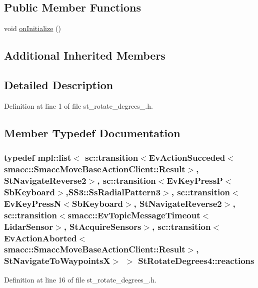 \subsection*{Public Member Functions}
\begin{DoxyCompactItemize}
\item 
void \hyperlink{structStRotateDegrees4_a25d516dde465ddfedc3a875fd93b9f47}{on\+Initialize} ()
\end{DoxyCompactItemize}
\subsection*{Additional Inherited Members}


\subsection{Detailed Description}


Definition at line 1 of file st\+\_\+rotate\+\_\+degrees\+\_.\+h.



\subsection{Member Typedef Documentation}
\subsubsection[{\texorpdfstring{reactions}{reactions}}]{\setlength{\rightskip}{0pt plus 5cm}typedef mpl\+::list$<$ sc\+::transition$<$Ev\+Action\+Succeded$<$smacc\+::\+Smacc\+Move\+Base\+Action\+Client\+::\+Result$>$, {\bf St\+Navigate\+Reverse2}$>$, sc\+::transition$<$Ev\+Key\+PressP$<$Sb\+Keyboard$>$,{\bf S\+S3\+::\+Ss\+Radial\+Pattern3}$>$, sc\+::transition$<$Ev\+Key\+PressN$<$Sb\+Keyboard$>$, {\bf St\+Navigate\+Reverse2}$>$, sc\+::transition$<${\bf smacc\+::\+Ev\+Topic\+Message\+Timeout}$<${\bf Lidar\+Sensor}$>$, {\bf St\+Acquire\+Sensors}$>$, sc\+::transition$<$Ev\+Action\+Aborted$<$smacc\+::\+Smacc\+Move\+Base\+Action\+Client\+::\+Result$>$, {\bf St\+Navigate\+To\+WaypointsX}$>$ $>$ {\bf St\+Rotate\+Degrees4\+::reactions}}\hypertarget{structStRotateDegrees4_afd68a8061d932ed3aa2e332700f3c430}{}\label{structStRotateDegrees4_afd68a8061d932ed3aa2e332700f3c430}


Definition at line 16 of file st\+\_\+rotate\+\_\+degrees\+\_.\+h.



